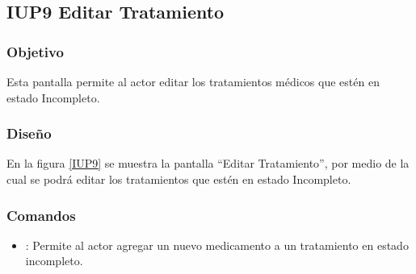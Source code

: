 \subsection{IUP9 Editar Tratamiento}
 
\subsubsection{Objetivo}

    Esta pantalla permite al actor editar los tratamientos médicos que estén en estado Incompleto.

\subsubsection{Diseño}

    En la figura \ref{IUP9} se muestra la pantalla ``Editar Tratamiento'', por medio de la cual se podrá editar los tratamientos que estén en estado Incompleto. \\
	\newpage

\subsubsection{Comandos}
\begin{itemize}
    \item {}: Permite al actor agregar un nuevo medicamento a un tratamiento en estado incompleto.
    
\end{itemize}

%

